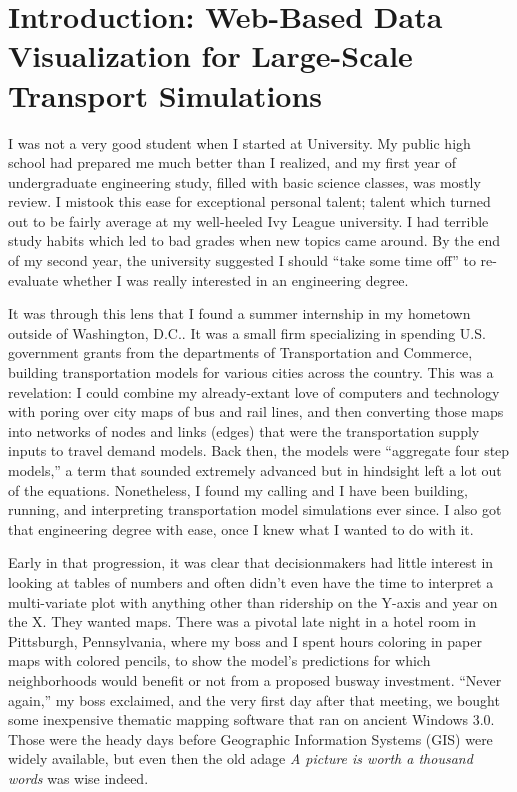 \hypertarget{introduction-main}{%
\section{Introduction: Web-Based Data Visualization for Large-Scale Transport Simulations}
\label{introduction-main}}

I was not a very good student when I started at University. My public high school had prepared me much better than I realized, and my first year of undergraduate engineering study, filled with basic science classes, was mostly review. I mistook this ease for exceptional personal talent; talent which turned out to be fairly average at my well-heeled Ivy League university. I had terrible study habits which led to bad grades when new topics came around. By the end of my second year, the university suggested I should ``take some time off'' to re-evaluate whether I was really interested in an engineering degree.

It was through this lens that I found a summer internship in my hometown outside of Washington, D.C.. It was a small firm specializing in spending U.S. government grants from the departments of Transportation and Commerce, building transportation models for various cities across the country. This was a revelation: I could combine my already-extant love of computers and technology with poring over city maps of bus and rail lines, and then converting those maps into networks of nodes and links (edges) that were the transportation supply inputs to travel demand models. Back then, the models were ``aggregate four step models,'' a term that sounded extremely advanced but in hindsight left a lot out of the equations. Nonetheless, I found my calling and I have been building, running, and interpreting transportation model simulations ever since. I also got that engineering degree with ease, once I knew what I wanted to do with it.

Early in that progression, it was clear that decisionmakers had little interest in looking at tables of numbers and often didn't even have the time to interpret a multi-variate plot with anything other than ridership on the Y-axis and year on the X. They wanted maps. There was a pivotal late night in a hotel room in Pittsburgh, Pennsylvania, where my boss and I spent hours coloring in paper maps with colored pencils, to show the model's predictions for which neighborhoods would benefit or not from a proposed busway investment. ``Never again,'' my boss exclaimed, and the very first day after that meeting, we bought some inexpensive thematic mapping software that ran on ancient Windows 3.0. Those were the heady days before Geographic Information Systems (GIS) were widely available, but even then the old adage \emph{A picture is worth a thousand words} was wise indeed.


